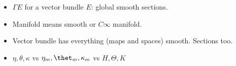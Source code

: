 \begin{itemize}
    \item $\Gamma E$ for a vector bundle $E$: global smooth sections.
    
    \item Manifold means smooth or $C\infty$ manifold.
    
    \item Vector bundle has everything (maps and spaces) smooth. Sections too.
    
    \item $\eta, \theta, \kappa$ vs $\eta_m, \thet_m, \kappa_m$ vs $H, \Theta, K$
\end{itemize}